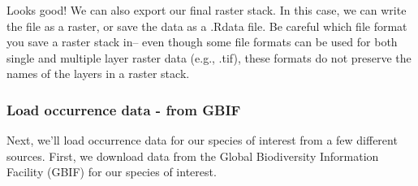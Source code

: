 \documentclass[]{article}
\begin{document}
Looks good! We can also export our final raster stack. In this case, we
can write the file as a raster, or save the data as a .Rdata file. Be
careful which file format you save a raster stack in-- even though some
file formats can be used for both single and multiple layer raster data
(e.g., .tif), these formats do not preserve the names of the layers in a
raster stack.

\subsubsection{Load occurrence data - from
GBIF}\label{load-occurrence-data---from-gbif}

Next, we'll load occurrence data for our species of interest from a few
different sources. First, we download data from the Global Biodiversity
Information Facility (GBIF) for our species of interest.
\end{document}
